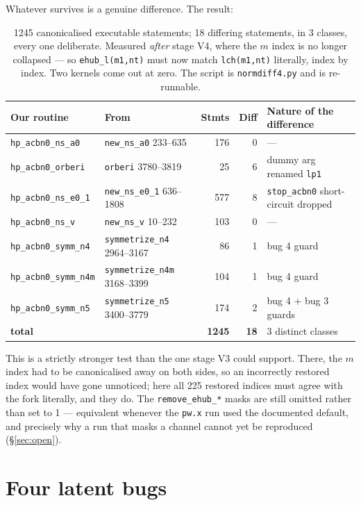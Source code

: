 \documentclass[11pt,a4paper]{article}
\newcommand{\C}[1]{\texttt{\small #1}}
\begin{document}
\noindent
Whatever survives is a genuine difference. The result:

\begin{table}[h]
\centering\small
\begin{tabular}{llrrl}
\toprule
Our routine & From & Stmts & Diff & Nature of the difference \\
\midrule
\C{hp_acbn0_ns_a0}    & \C{new_ns_a0} 233--635        & 176 & 0 & --- \\
\C{hp_acbn0_orberi}   & \C{orberi} 3780--3819         &  25 & 6 & dummy arg renamed \C{lp1} \\
\C{hp_acbn0_ns_e0_1}  & \C{new_ns_e0_1} 636--1808     & 577 & 8 & \C{stop_acbn0} short-circuit dropped \\
\C{hp_acbn0_ns_v}     & \C{new_ns_v} 10--232          & 103 & 0 & --- \\
\C{hp_acbn0_symm_n4}  & \C{symmetrize_n4} 2964--3167  &  86 & 1 & bug 4 guard \\
\C{hp_acbn0_symm_n4m} & \C{symmetrize_n4m} 3168--3399 & 104 & 1 & bug 4 guard \\
\C{hp_acbn0_symm_n5}  & \C{symmetrize_n5} 3400--3779  & 174 & 2 & bug 4 + bug 3 guards \\
\midrule
\textbf{total} & & \textbf{1245} & \textbf{18} & 3 distinct classes \\
\bottomrule
\end{tabular}
\caption{1245 canonicalised executable statements; 18 differing statements, in
3 classes, every one deliberate. Measured \emph{after} stage V4, where the
$m$ index is no longer collapsed --- so \C{ehub_l(m1,nt)} must now match
\C{lch(m1,nt)} literally, index by index. Two kernels come out at zero. The
script is \C{normdiff4.py} and is re-runnable.}
\end{table}

\noindent
This is a strictly stronger test than the one stage V3 could support. There,
the $m$ index had to be canonicalised away on both sides, so an incorrectly
restored index would have gone unnoticed; here all 225 restored indices must
agree with the fork literally, and they do. The \C{remove_ehub_*} masks are
still omitted rather than set to 1 --- equivalent whenever the \C{pw.x} run
used the documented default, and precisely why a run that masks a channel
cannot yet be reproduced (\S\ref{sec:open}).

\section{Four latent bugs}\label{sec:bugs}
\end{document}
